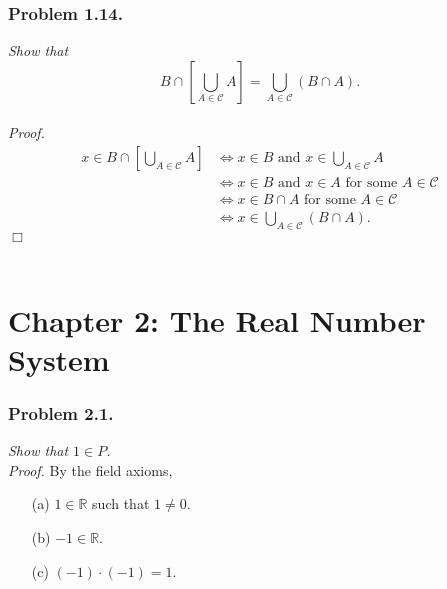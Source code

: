 \documentclass{article}
\begin{document}



\subsubsection*{Problem 1.14.}
\emph{Show that
$$B \cap \left[ \bigcup_{A \in \mathscr{C}} A \right]
= \bigcup_{A \in \mathscr{C}}(B \cap A).$$} \\

\emph{Proof.}
\begin{align*}
x \in B \cap \left[ \bigcup_{A \in \mathscr{C}} A \right]
& \Longleftrightarrow
x \in B \text{ and } x \in \bigcup_{A \in \mathscr{C}} A \\
& \Longleftrightarrow
x \in B \text{ and } x \in A \text{ for some } A \in \mathscr{C} \\
& \Longleftrightarrow
x \in B \cap A \text{ for some } A \in \mathscr{C} \\
& \Longleftrightarrow
x \in \bigcup_{A \in \mathscr{C}}(B \cap A).
\end{align*}
$\Box$ \\\\






\newpage
\section*{Chapter 2: The Real Number System \\}



\subsubsection*{Problem 2.1.}
\emph{Show that $1 \in P$.} \\

\emph{Proof.}
By the field axioms,
\begin{enumerate}
\item[(a)]
$1 \in \mathbb{R}$ such that $1 \neq 0$.
\item[(b)]
$-1 \in \mathbb{R}$.
\item[(c)]
$(-1) \cdot (-1) = 1$.
\end{enumerate}
\end{document}
